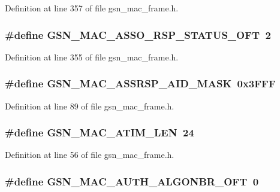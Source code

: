 Definition at line 357 of file gsn\_\-mac\_\-frame.h.

\hypertarget{a00523_acb7c063b275a7c39400b458318562218}{
\subsubsection[{GSN\_\-MAC\_\-ASSO\_\-RSP\_\-STATUS\_\-OFT}]{\setlength{\rightskip}{0pt plus 5cm}\#define GSN\_\-MAC\_\-ASSO\_\-RSP\_\-STATUS\_\-OFT~2}}
\label{a00523_acb7c063b275a7c39400b458318562218}


Definition at line 355 of file gsn\_\-mac\_\-frame.h.

\hypertarget{a00523_a894338c879e33b667638a78f65e923a2}{
\subsubsection[{GSN\_\-MAC\_\-ASSRSP\_\-AID\_\-MASK}]{\setlength{\rightskip}{0pt plus 5cm}\#define GSN\_\-MAC\_\-ASSRSP\_\-AID\_\-MASK~0x3FFF}}
\label{a00523_a894338c879e33b667638a78f65e923a2}


Definition at line 89 of file gsn\_\-mac\_\-frame.h.

\hypertarget{a00523_a5368be5a9fe35b1667e69eab4e5fad3d}{
\subsubsection[{GSN\_\-MAC\_\-ATIM\_\-LEN}]{\setlength{\rightskip}{0pt plus 5cm}\#define GSN\_\-MAC\_\-ATIM\_\-LEN~24}}
\label{a00523_a5368be5a9fe35b1667e69eab4e5fad3d}


Definition at line 56 of file gsn\_\-mac\_\-frame.h.

\hypertarget{a00523_aa1ee340ec2ac67bdefd6d069c4e74361}{
\subsubsection[{GSN\_\-MAC\_\-AUTH\_\-ALGONBR\_\-OFT}]{\setlength{\rightskip}{0pt plus 5cm}\#define GSN\_\-MAC\_\-AUTH\_\-ALGONBR\_\-OFT~0}}
\label{a00523_aa1ee340ec2ac67bdefd6d069c4e74361}


